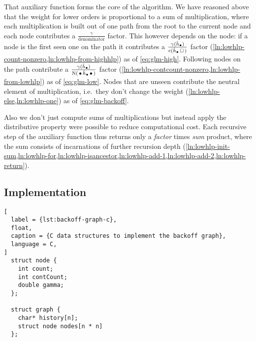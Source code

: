 That auxiliary function  forms the core of the algorithm.
We have reasoned above that the weight for lower orders is proportional to
a sum of multiplication, where each multiplication is built out of one path
from the root to the current node and each node contributes a
$\frac{\gamma}{\text{denominator}}$ factor.
This however depends on the node: if a node is the first seen one on the path
it contributes a
$\frac{\gamma(\DerivedHistory[\DummyIndex])}{\Count(\DerivedHistory[\DummyIndex] \Skp)}$
factor (\cref{ln:lowhlp-count-nonzero,ln:lowhlp-from-highhlp}) as of
\cref{eq:glm-high}. Following nodes on the path contribute a
$\frac{\gamma(\DerivedHistory[\DummyIndex])}{\ContCount(\WSkp \DerivedHistory[\DummyIndex] \WSkp)}$
factor (\cref{ln:lowhlp-contcount-nonzero,ln:lowhlp-from-lowhlp}) as of
\cref{eq:glm-low}.
Nodes that are unseen contribute the neutral element of multiplication, i.e.\
they don't change the weight (\cref{ln:lowhlp-else,ln:lowhlp-one}) as of
\cref{eq:glm-backoff}.

Also we don't just compute sums of multiplications but instead apply
the distributive property were possible to reduce computational cost.
Each recursive step of the auxiliary function thus returns only a \emph{factor}
times \emph{sum} product, where the sum consists of incarnations of further
recursion depth
(\cref{ln:lowhlp-init-sum,ln:lowhlp-for,ln:lowhlp-isancestor,ln:lowhlp-add-1,ln:lowhlp-add-2,ln:lowhlp-return}).

\subsection{Implementation}
\label{subsec:weightedsum-glm-implementation}


\begin{lstlisting}[
  label = {lst:backoff-graph-c},
  float,
  caption = {C data structures to implement the backoff graph},
  language = C,
]
  struct node {
    int count;
    int contCount;
    double gamma;
  };

  struct graph {
    char* history[n];
    struct node nodes[n * n]
  };
\end{lstlisting}

